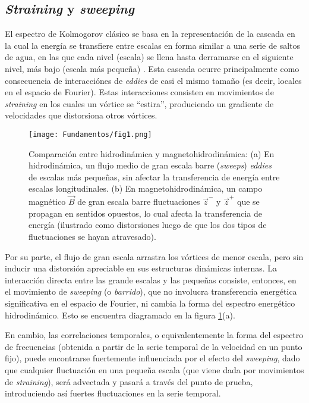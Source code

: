\subsection{\textit{Straining} y \textit{sweeping}}

El espectro de Kolmogorov clásico se basa en la representación de la
cascada en la cual la energía se transfiere entre escalas en forma
similar a una serie de saltos de agua, en las que cada nivel (escala)
se llena hasta derramarse en el siguiente nivel, más bajo (escala más
pequeña) \cite{tennekes_first_1972}. Esta cascada ocurre
principalmente como consecuencia de interacciónes de \textit{eddies}
de casi el mismo tamaño (es decir, locales en el espacio de
Fourier). Estas interacciones consisten en movimientos de
\textit{straining} en los cuales un vórtice se ``estira'', produciendo
un gradiente de velocidades que distorsiona otros vórtices.


\begin{figure}[h]
  \centering
  \texttt{[image: Fundamentos/fig1.png]}
  \caption{Comparación entre hidrodinámica y magnetohidrodinámica: (a)
    En hidrodinámica, un flujo medio de gran escala barre
    (\emph{sweeps}) \emph{eddies} de escalas más pequeñas, sin
    afectar la transferencia de energía entre escalas
    longitudinales. (b) En magnetohidrodinámica, un campo magnético
    $\vec{B}$ de gran escala barre fluctuaciones $\vec{z}^-$ y
    $\vec{z}^+$ que se propagan en sentidos opuestos, lo cual afecta
    la transferencia de energía (ilustrado como distorsiones luego de
    que los dos tipos de fluctuaciones se hayan atravesado).}
  \label{fig:HDvsMHD}
\end{figure}



Por su parte, el flujo de gran escala arrastra los vórtices de menor
escala, pero sin inducir una distorsión apreciable en sus estructuras
dinámicas internas. La interacción directa entre las grande escalas y
las pequeñas consiste, entonces, en el movimiento de \textit{sweeping}
(o \textit{barrido}), que no involucra transferencia energética
significativa en el espacio de Fourier, ni cambia la forma del
espectro energético hidrodinámico. Esto se encuentra diagramado en la
figura \ref{fig:HDvsMHD}(a).

En cambio, las correlaciones temporales, o equivalentemente la forma
del espectro de frecuencias (obtenida a partir de la serie temporal de
la velocidad en un punto fijo), puede encontrarse fuertemente
influenciada por el efecto del \textit{sweeping}, dado que cualquier
fluctuación en una pequeña escala (que viene dada por movimientos de
\textit{straining}), será advectada y pasará a través del punto de
prueba, introduciendo así fuertes fluctuaciones en la serie temporal.

